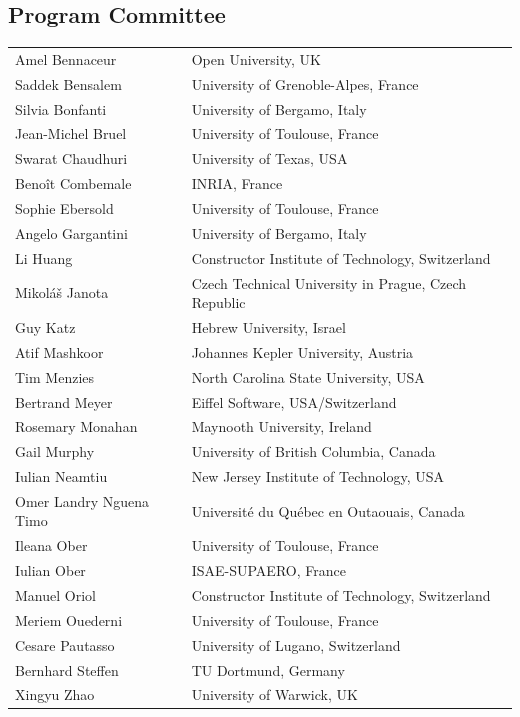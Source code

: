 \subsection*{Program Committee}
\noindent
\begin{tabular}{@{}p{4.3cm}@{\hspace{0.3cm}}p{7.6cm}@{}}
Amel Bennaceur & Open University, UK \\
Saddek Bensalem & University of Grenoble-Alpes, France \\
Silvia Bonfanti & University of Bergamo, Italy \\
Jean-Michel Bruel & University of Toulouse, France \\
Swarat Chaudhuri & University of Texas, USA \\
Beno\^{i}t Combemale & INRIA, France \\
Sophie Ebersold & University of Toulouse, France \\
Angelo Gargantini & University of Bergamo, Italy \\
Li Huang & Constructor Institute of Technology, Switzerland \\
Mikol\'{a}\v{s} Janota & Czech Technical University in Prague, Czech Republic \\
Guy Katz & Hebrew University, Israel \\
Atif Mashkoor & Johannes Kepler University, Austria \\
Tim Menzies & North Carolina State University, USA \\
Bertrand Meyer & Eiffel Software, USA/Switzerland \\
Rosemary Monahan & Maynooth University, Ireland \\
Gail Murphy & University of British Columbia, Canada \\
Iulian Neamtiu & New Jersey Institute of Technology, USA \\
Omer Landry Nguena Timo & Universit\'{e} du Qu\'{e}bec en Outaouais, Canada \\
Ileana Ober & University of Toulouse, France \\
Iulian Ober & ISAE-SUPAERO, France \\
Manuel Oriol & Constructor Institute of Technology, Switzerland \\
Meriem Ouederni & University of Toulouse, France \\
Cesare Pautasso & University of Lugano, Switzerland \\
Bernhard Steffen & TU Dortmund, Germany \\
Xingyu Zhao & University of Warwick, UK \\
\end{tabular}

